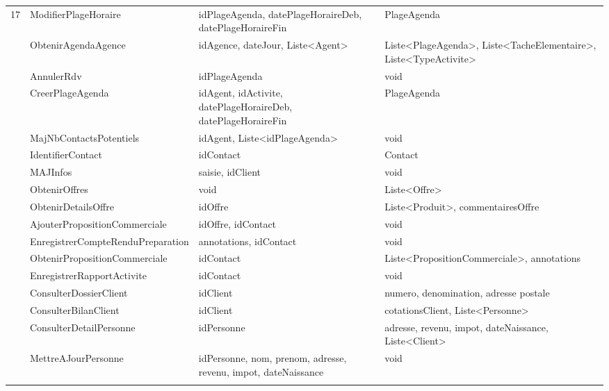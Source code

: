 \begin{table}[H]
{\begin{tabular}{P{0.8cm}P{5.5cm}P{6cm}P{6cm}}
			17 & ModifierPlageHoraire & idPlageAgenda, datePlageHoraireDeb, datePlageHoraireFin &  PlageAgenda \\  & ObtenirAgendaAgence & idAgence, dateJour, Liste<Agent> &  Liste<PlageAgenda>, Liste<TacheElementaire>,  Liste<TypeActivite> \\  & AnnulerRdv & idPlageAgenda &  void \\  & CreerPlageAgenda & idAgent, idActivite, datePlageHoraireDeb, datePlageHoraireFin &  PlageAgenda \\  & MajNbContactsPotentiels & idAgent, Liste<idPlageAgenda> &  void \\  & IdentifierContact & idContact &  Contact \\  & MAJInfos & saisie, idClient &  void \\  & ObtenirOffres & void &  Liste<Offre> \\  & ObtenirDetailsOffre & idOffre &  Liste<Produit>, commentairesOffre \\  & AjouterPropositionCommerciale & idOffre, idContact &  void \\  & EnregistrerCompteRenduPreparation & annotations, idContact &  void \\  & ObtenirPropositionCommerciale & idContact &  Liste<PropositionCommerciale>, annotations \\  & EnregistrerRapportActivite & idContact &  void \\  & ConsulterDossierClient & idClient &  numero, denomination, adresse postale \\  & ConsulterBilanClient & idClient &  cotationsClient, Liste<Personne> \\  & ConsulterDetailPersonne & idPersonne &  adresse, revenu, impot, dateNaissance, Liste<Client> \\  & MettreAJourPersonne & idPersonne, nom, prenom, adresse, revenu, impot, dateNaissance &  void \\ \hline

\end{tabular}}
\end{table}
